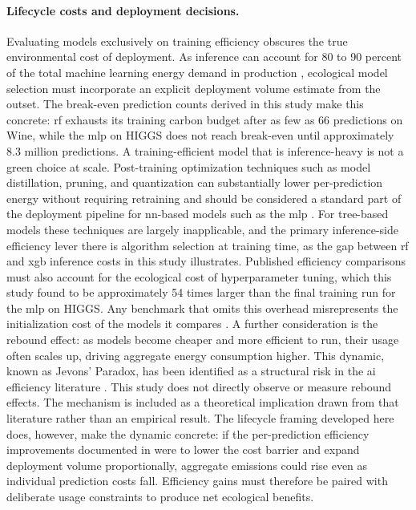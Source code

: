 \paragraph{Lifecycle costs and deployment decisions.}
Evaluating models exclusively on training efficiency obscures the true environmental cost of deployment. As inference can account for 80 to 90 percent of the total machine learning energy demand in production \cite{desislavovTrendsAIInference2023}, ecological model selection must incorporate an explicit deployment volume estimate from the outset. The break-even prediction counts derived in this study make this concrete: \gls{rf} exhausts its training carbon budget after as few as 66 predictions on Wine, while the \gls{mlp} on HIGGS does not reach break-even until approximately 8.3 million predictions. A training-efficient model that is inference-heavy is not a green choice at scale. Post-training optimization techniques such as model distillation, pruning, and quantization can substantially lower per-prediction energy without requiring retraining and should be considered a standard part of the deployment pipeline for \gls{nn}-based models such as the \gls{mlp} \cite{pattersonCarbonEmissionsLarge2021}. For tree-based models these techniques are largely inapplicable, and the primary inference-side efficiency lever there is algorithm selection at training time, as the gap between \gls{rf} and \gls{xgb} inference costs in this study illustrates. Published efficiency comparisons must also account for the ecological cost of hyperparameter tuning, which this study found to be approximately 54 times larger than the final training run for the \gls{mlp} on HIGGS. Any benchmark that omits this overhead misrepresents the initialization cost of the models it compares \cite{strubellEnergyPolicyConsiderations2019a}. A further consideration is the rebound effect: as models become cheaper and more efficient to run, their usage often scales up, driving aggregate energy consumption higher. This dynamic, known as Jevons' Paradox, has been identified as a structural risk in the \gls{ai} efficiency literature \cite{luccioniPowerHungryProcessing2024}. This study does not directly observe or measure rebound effects. The mechanism is included as a theoretical implication drawn from that literature rather than an empirical result. The lifecycle framing developed here does, however, make the dynamic concrete: if the per-prediction efficiency improvements documented in  were to lower the cost barrier and expand deployment volume proportionally, aggregate emissions could rise even as individual prediction costs fall. Efficiency gains must therefore be paired with deliberate usage constraints to produce net ecological benefits.

